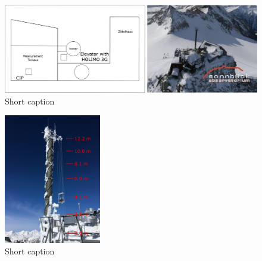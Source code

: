 \documentclass[draft,linenumbers]{agujournal}
\begin{document}


\newpage

\begin{figure}[h]
 \centering
 	\includegraphics[width=30pc]{SetUp.png}
 \caption{Short caption}
 \label{fig:SetUp}
\end{figure}

\begin{figure}[h]
 \centering
 	\includegraphics[width=10pc]{tower.png}
 \caption{Short caption}
 \label{fig:Elevator}
\end{figure}
\end{document}
